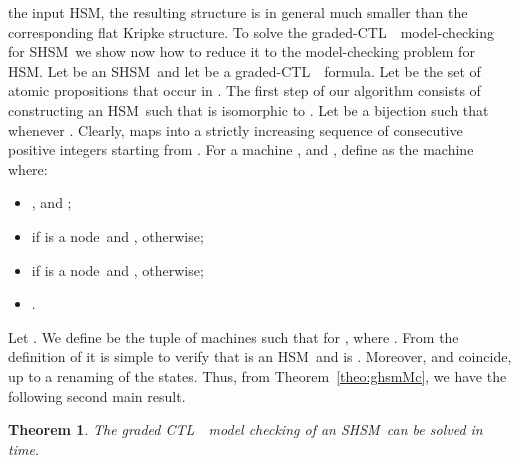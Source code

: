 \documentclass[letterpaper,twocolumn,10pt]{article}
\newtheorem{theorem}{Theorem}
\def    \ctl        {\mbox{\textsc{CTL }\xspace}}
\newcommand{\VHSM}{SHSM}
\newcommand{\HSM}{HSM}
\newcommand{\nnode}{node} \newcommand{\nnodes}{nodes} \newcommand{\expand} {\mathit{expn}}
\begin{document}
the input \HSM, the resulting structure is in general much smaller than the corresponding flat Kripke structure.
To solve the graded-\ctl\ model-checking for \VHSM\ we show now how to reduce it to the model-checking
problem for \HSM.
Let   be an  \VHSM\ and let  be a graded-\ctl\ formula.
Let  be the set of atomic propositions that occur
in . The first step of our algorithm consists of constructing
an \HSM\  such that  is isomorphic to .
Let 
be a bijection such that
 whenever
. Clearly,  maps   into a strictly
increasing sequence of consecutive positive integers starting from .
For a machine
,  and
,
define  as the machine 
where:
\begin{itemize}
\item , and ;
\item  if  is a \nnode\ and
      , otherwise;
\item  if  is a \nnode\ and
      , otherwise;
\item .
\end{itemize}
Let . We define  be the tuple of
machines 
such that for ,  where .
From the definition of  it is simple to verify that 
is an \HSM\ and  is .
Moreover,  and  coincide,
up to a renaming of the states.
Thus, from Theorem~\ref{theo:ghsmMc}, we have the following second main result.
\begin{theorem}\label{theo:gshsmMc}
The graded \ctl\ model checking of an \VHSM\ can be solved in
 time.
\end{theorem}
\end{document}
